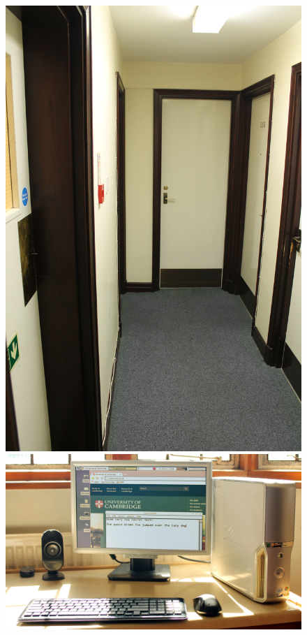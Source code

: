 \documentclass[a4paper,12pt,twoside,openright]{report}
\begin{document}
\begin{figure}[p]
\begin{minipage}[c][9cm][t]{.39\textwidth}
  \includegraphics[width=\textwidth]{demo_hall}
\end{minipage}\hspace{0.5cm}
\begin{minipage}[c][9cm][t]{.45\textwidth}
  \vspace*{\fill}
  \centering
  \includegraphics[width=\textwidth]{demo_target}

\end{minipage}
\end{figure}
\end{document}
